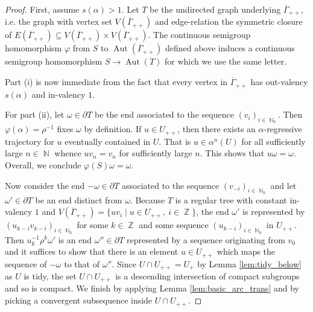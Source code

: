 \documentclass{article}
\DeclareMathOperator\Aut{Aut}
\DeclareMathOperator\bbN{\mathbb{N}}
\DeclareMathOperator\bbZ{\mathbb{Z}}
\theoremstyle{definition}
\begin{document}
\begin{proof}
First, assume $s(\alpha)>1$. Let $T$ be the undirected graph underlying $\overline{\Gamma}_{++}$, i.e. the graph with vertex set $V(\overline{\Gamma}_{++})$ and edge-relation the symmetric closure of $E(\overline{\Gamma}_{++})\subseteq V(\overline{\Gamma}_{++})\times V(\overline{\Gamma}_{++})$. The continuous semigroup homomorphism $\varphi$ from $S$ to $\Aut(\overline{\Gamma}_{++})$ defined above induces a continuous semigroup homomorphism $S\to \Aut(T)$ for which we use the same letter.

Part (i) is now immediate from the fact that every vertex in $\overline{\Gamma}_{++}$ has out-valency $s(\alpha)$ and in-valency $1$.

For part (ii), let $\omega\in\partial T$ be the end associated to the sequence $(v_i)_{i\in\bbN_{0}}$. Then $\varphi(\alpha)=\rho^{-1}$ fixes $\omega$ by definition. If $u\in U_{++}$, then there exists an $\alpha$-regressive trajectory for $u$ eventually contained in $U$. That is $u\in\alpha^{n}(U)$ for all sufficiently large $n\in\bbN$ whence $uv_{n} = v_{n}$ for sufficiently large $n$. This shows that $u\omega=\omega$. Overall, we conclude $\varphi(S)\omega=\omega$. 

Now consider the end $-\omega\in\partial T$ associated to the sequence $(v_{-i})_{i\in\bbN_{0}}$ and let $\omega'\in\partial T$ be an end distinct from $\omega$. Because $T$ is a regular tree with constant in-valency $1$ and $V(\overline{\Gamma}_{++})=\{uv_{i}\mid u\in U_{++},\ i\in\bbZ\}$, the end $\omega'$ is represented by $(u_{k-i}v_{k-i})_{i\in\bbN_{0}}$ for some $k\in\bbZ$ and some sequence $(u_{k-i})_{i\in\bbN_{0}}$ in $U_{++}$. Then $u_{k}^{-1}\rho^{k}\omega'$ is an end $\omega''\in\partial T$ represented by a sequence originating from $v_{0}$ and it suffices to show that there is an element $u\in U_{++}$ which maps the sequence of $-\omega$ to that of $\omega''$. Since $U\cap U_{++}=U_{+}$ by Lemma \ref{lem:tidy_below} as $U$ is tidy, the set $U\cap U_{++}$ is a descending intersection of compact subgroups and so is compact. We finish by applying Lemma \ref{lem:basic_arc_trans} and by picking a convergent subsequence inside $U\cap U_{++}$.


\end{proof}
\end{document}
